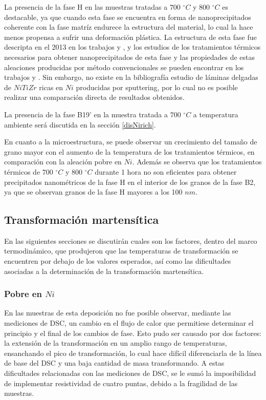 \documentclass[12pt]{article}
\theoremstyle{definition}
\theoremstyle{remark}
\begin{document}
La presencia de la fase H en las muestras tratadas a $700$ $^\circ C$ y $800$ $^\circ C$ es destacable, ya que cuando esta fase se encuentra en forma de nanoprecipitados coherente con la fase matríz endurece la estructura del material, lo cual la hace menos propensa a sufrir una deformación plástica. La estructura de esta fase fue descripta en el 2013 en los trabajos \citep{Santamarta2013} y \citep{Yang2013}, y los estudios de los tratamientos térmicos necesarios para obtener nanoprecipitados de esta fase y las propiedades de estas aleaciones producidas por método convencionales se pueden encontrar en los trabajos \citep{Evirgen2013} \citep{Evirgen2014} \citep{Evirgen2016} \citep{Perez-Sierra2016} \citep{Evirgen2018} y \citep{Bigelow2019}. Sin embargo, no existe en la bibliografía estudio de láminas delgadas de $NiTiZr$ ricas en $Ni$ producidas por sputtering, por lo cual no es posible realizar una comparación directa de resultados obtenidos.

La presencia de la fase B19' en la muestra tratada a $700$ $^\circ C$ a temperatura ambiente será discutida en la sección \ref{disNirich}.

En cuanto a la microestructura, se puede observar un crecimiento del tamaño de grano mayor con el aumento de la temperatura de los tratamientos térmicos, en comparación con la aleación pobre en $Ni$. Además se observa que los tratamientos térmicos de $700$ $^\circ C$ y $800$ $^\circ C$ durante 1 hora no son eficientes para obtener precipitados nanométricos de la fase H en el interior de los granos de la fase B2, ya que se observan granos de la fase H mayores a los 100 $nm$.


\subsection{Transformación martensítica}
\label{TransfomacionDiscusion}

En las siguientes secciones se discutirán cuales son los factores, dentro del marco termodinámico, que produjeron que las temperaturas de transformación se encuentren por debajo de los valores esperados, así como las dificultades asociadas a la determinación de la transformación martensítica.

\subsubsection{Pobre en $Ni$}
En las muestras de esta deposición no fue posible observar, mediante las mediciones de DSC, un cambio en el flujo de calor que permitiese determinar el principio y el final de los cambios de fase. Esto pudo ser causado por dos factores: la extensión de la transformación en un amplio rango de temperaturas, ensanchando el pico de transformación, lo cual hace difícil diferenciarla de la línea de base del DSC y una baja cantidad de masa transformando. A estas dificultades relacionadas con las mediciones de DSC, se le sumó la imposibilidad de implementar resistividad de cuatro puntas, debido a la fragilidad de las muestras.
\end{document}
